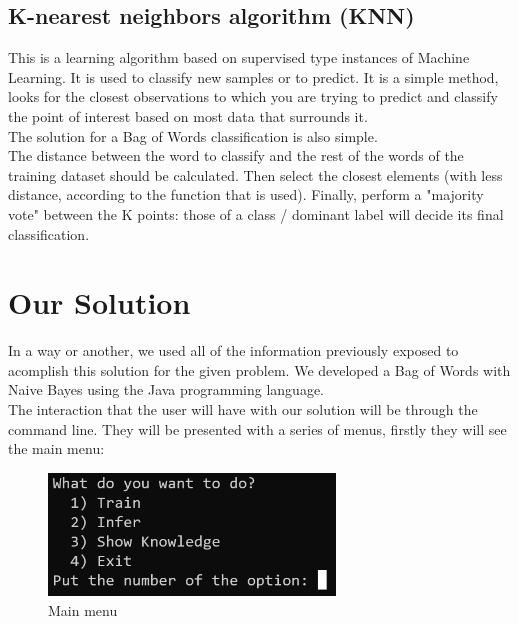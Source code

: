 \documentclass[sigconf,12pt,review=false,natbib=false]{acmart}
\begin{document}
\subsection{K-nearest neighbors algorithm (KNN)}

This is a learning algorithm based on supervised type instances of Machine Learning. It is used to classify new samples
or to predict. It is a simple method, looks for the closest observations to which you are trying to predict and classify
the point of interest based on most data that surrounds it. \\

The solution for a Bag of Words classification is also simple. \\

The distance between the word to classify and the rest of the words of the training dataset should be calculated. Then
select the closest elements (with less distance, according to the function that is used). Finally, perform a "majority
vote" between the K points: those of a class / dominant label will decide its final classification. \\

\section{Our Solution}

In a way or another, we used all of the information previously exposed to acomplish this solution for the given problem.
We developed a Bag of Words with Naive Bayes using the Java programming language. \\

The interaction that the user will have with our solution will be through the command line. They will be presented
with a series of menus, firstly they will see the main menu: \\

\begin{figure}[h!]
    \centering
    \includegraphics[width=3in]{main_menu}
    \caption{Main menu}
    \label{fig:main_menu}
\end{figure}
\end{document}
